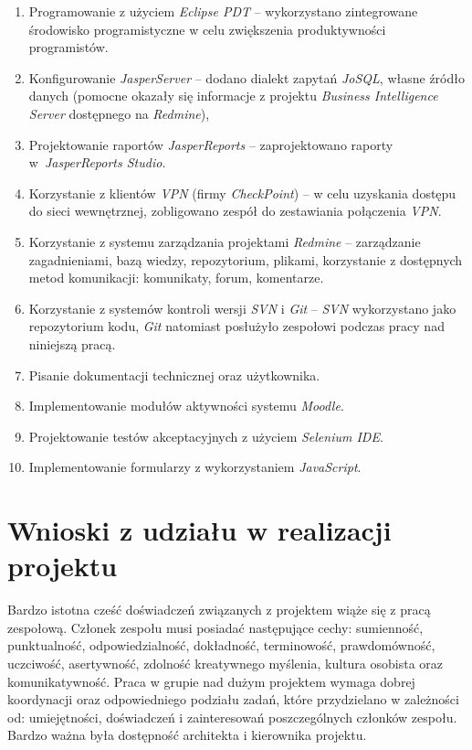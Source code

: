 \begin{enumerate}
\item Programowanie z użyciem \textit{Eclipse PDT} -- wykorzystano zintegrowane środowisko programistyczne w celu zwiększenia produktywności programistów.
\item Konfigurowanie \textit{JasperServer} -- dodano dialekt zapytań \textit{JoSQL}, własne źródło danych (pomocne okazały się informacje z projektu \textit{Business Intelligence Server} dostępnego na \textit{Redmine}),
\item Projektowanie raportów \textit{JasperReports} -- zaprojektowano raporty w~\textit{JasperReports Studio}.
\item Korzystanie z klientów \textit{VPN} (firmy \textit{CheckPoint}) -- w celu uzyskania dostępu do sieci wewnętrznej, zobligowano zespół do zestawiania połączenia \textit{VPN}.
\item Korzystanie z systemu zarządzania projektami \textit{Redmine} -- zarządzanie zagadnieniami, bazą wiedzy, repozytorium, plikami, korzystanie z dostępnych metod komunikacji: komunikaty, forum, komentarze.
\item Korzystanie z systemów kontroli wersji \textit{SVN} i \textit{Git} -- \textit{SVN} wykorzystano jako repozytorium kodu, \textit{Git} natomiast posłużyło zespołowi podczas pracy nad niniejszą pracą.
\item Pisanie dokumentacji technicznej oraz użytkownika.
\item Implementowanie modułów aktywności systemu \textit{Moodle}.
\item Projektowanie testów akceptacyjnych z użyciem \textit{Selenium IDE}.
\item Implementowanie formularzy z wykorzystaniem \textit{JavaScript}.
\end{enumerate}

\section{Wnioski z udziału w realizacji projektu}
\label{Chapter82}

Bardzo istotna cześć doświadczeń związanych z projektem wiąże się z pracą zespołową. Członek zespołu musi posiadać następujące cechy: sumienność, punktualność, odpowiedzialność, dokładność, terminowość, prawdomówność, uczciwość, asertywność, zdolność kreatywnego myślenia, kultura osobista oraz komunikatywność. Praca w grupie nad dużym projektem wymaga dobrej koordynacji oraz odpowiedniego podziału zadań, które przydzielano w zależności od: umiejętności, doświadczeń i zainteresowań poszczególnych członków zespołu. Bardzo ważna była dostępność architekta i kierownika projektu.

